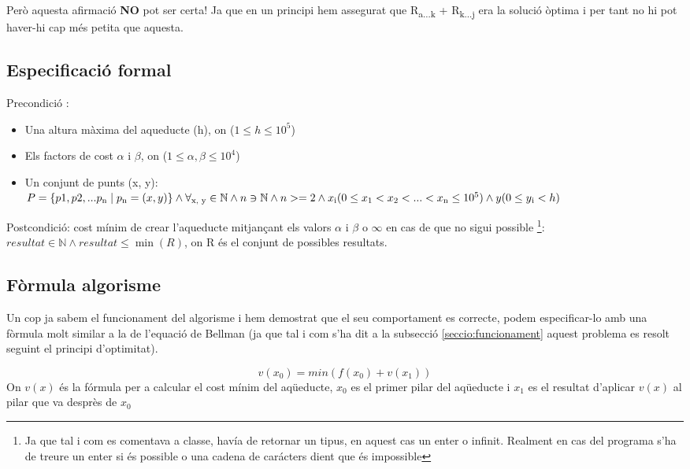 \documentclass[12pt, letterpaper]{article}
\begin{document}
Però aquesta afirmació \textbf{NO} pot ser certa! Ja que en un principi hem assegurat que R\textsubscript{a...k} + R\textsubscript{k...j} era la solució òptima i per tant no hi pot haver-hi cap més petita que aquesta.


\subsection{Especificació formal}
Precondició :
\begin{itemize}
    \item Una altura màxima del aqueducte (h), on ($1 \leq h \leq 10^5$)
    \item Els factors de cost $\alpha$ i $\beta$, on ($1\leq \alpha, \beta \leq 10^4$)
    \item Un conjunt de punts (x, y):\\
        $P = \{p1, p2, ... p\textsubscript{n} \mid p\textsubscript{n} = (x, y) \} \land \forall \textsubscript{x, y} \in \mathbb{N} \land n \owns \mathbb{N} \land n >= 2 
        \land x\textsubscript{i} (0\leq x\textsubscript{1} < x\textsubscript{2} < ... < x\textsubscript{n} \leq 10^5) \land y (0 \leq y\textsubscript{i} < h) $

\end{itemize}
Postcondició: cost mínim de crear l'aqueducte mitjançant els valors $\alpha$ i $\beta$ o $\infty$ en cas de que no sigui possible \footnote{Ja que tal i com es comentava a classe, havía de retornar un tipus, en aquest cas un enter o infinit. Realment en cas del programa s'ha de treure un enter si és possible o una cadena de carácters dient que és impossible}:\\

        $ resultat \in \mathbb{N} \land resultat \leq \min(R) $, on R és el conjunt de possibles resultats.


\subsection{Fòrmula algorisme}
Un cop ja sabem el funcionament del algorisme i hem demostrat que el seu comportament es correcte, podem especificar-lo amb una fòrmula molt similar a la de l'equació de Bellman (ja que tal i com s'ha dit a la subsecció \ref{seccio:funcionament} aquest problema es resolt seguint el principi d'optimitat).

\begin{center}
\begin{equation}
v(x_{0}) = min(f(x_{0}) + v(x_{1}))
\end{equation}
On $v(x)$ és la fórmula per a calcular el cost mínim del aqüeducte, $x_{0}$ es el primer pilar del aqüeducte i $x_{1}$ es el resultat d'aplicar $v(x)$ al pilar que va desprès de $x_{0}$
\end{center}
\end{document}
